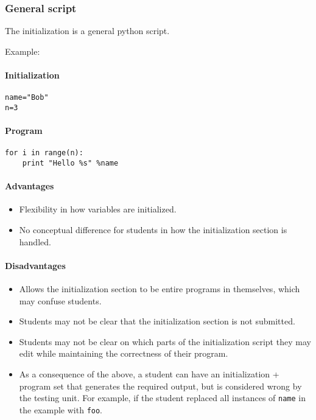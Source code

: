 \subsubsection{General script}
The initialization is a general python script.

Example:
\paragraph{Initialization}
\begin{verbatim}
name="Bob"
n=3
\end{verbatim} 
\paragraph{Program}
\begin{verbatim}
for i in range(n):
    print "Hello %s" %name
\end{verbatim}

\paragraph{Advantages}
\begin{itemize}
\item Flexibility in how variables are initialized.
\item No conceptual difference for students in how the initialization section is handled.
\end{itemize}

\paragraph{Disadvantages}
\begin{itemize}
\item Allows the initialization section to be entire programs in themselves, which may confuse students.
\item Students may not be clear that the initialization section is not submitted.
\item Students may not be clear on which parts of the initialization script they may edit while maintaining the correctness of their program.
\item As a consequence of the above, a student can have an initialization + program set that generates the required output, but is considered wrong by the testing unit. For example, if the student replaced all instances of \texttt{name} in the example with \texttt{foo}.
\end{itemize}

